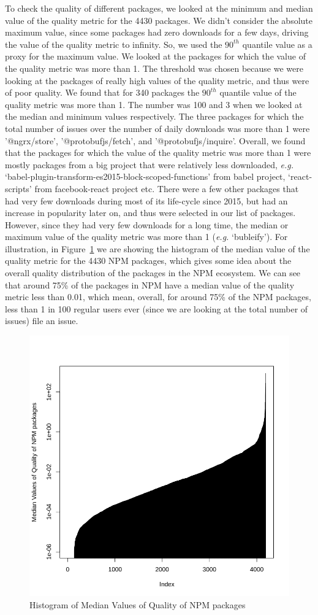 \documentclass[smallextended]{svjour3}       %
\begin{document}
To check the quality of different packages, we looked at the minimum and median value of the quality metric for the 4430 packages. We didn't consider the absolute maximum value, since some packages had zero downloads for a few days, driving the value of the quality metric to infinity. So, we used the $90^{th}$ quantile value as a proxy for the maximum value. We looked at the packages for which the value of the quality metric was more than 1. The threshold was chosen because we were looking at the packages of really high values of the quality metric, and thus were of poor quality. We found that for 340 packages the $90^{th}$ quantile value of the quality metric was more than 1. The number was 100 and 3 when we looked at the median and minimum values respectively. The three packages for which the total number of issues over the number of daily downloads was more than 1 were '@ngrx/store', '@protobufjs/fetch', and '@protobufjs/inquire'. Overall, we found that the packages for which the value of the quality metric was more than 1 were mostly packages from a big project that were relatively less downloaded, \emph{e.g.} `babel-plugin-transform-es2015-block-scoped-functions' from babel project, `react-scripts' from facebook-react project etc. There were a few other packages that had very few downloads during most of its life-cycle since 2015, but had an increase in popularity later on, and thus were selected in our list of packages. However, since they had very few downloads for a long time, the median or maximum value of the quality metric was more than 1 (\emph{e.g.} `bubleify'). 
For illustration, in Figure~\ref{fig:qNPM} we are showing the histogram of the median value of the quality metric for the 4430 NPM packages, which gives some idea about the overall quality distribution of the packages in the NPM ecosystem. We can see that around 75\% of the packages in NPM have a median value of the quality metric less than 0.01, which mean, overall, for around 75\% of the NPM packages, less than 1 in 100 regular users ever (since we are looking at the total number of issues) file an issue.

\begin{figure}[!t]
\centering
\includegraphics[width=0.75\linewidth]{qNPM}
\caption{Histogram of Median Values of Quality of NPM packages}
\label{fig:qNPM}
\end{figure}
\end{document}
